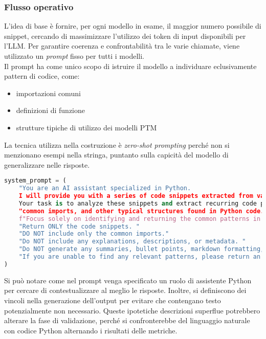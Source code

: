\documentclass{article}
\begin{document}
\subsubsection{Flusso operativo}
L'idea di base è fornire, per ogni modello in esame, il maggior numero possibile di snippet, cercando di massimizzare l’utilizzo dei token di input disponibili per l’LLM. Per garantire coerenza e confrontabilità tra le varie chiamate, viene utilizzato un \textit{prompt} fisso per tutti i modelli. \\
Il prompt ha come unico scopo di istruire il modello a individuare eclusivamente pattern di codice, come:
\begin{itemize}
    \item importazioni comuni
    \item definizioni di funzione
    \item strutture tipiche di utilizzo dei modelli PTM
\end{itemize}
La tecnica utilizza nella costruzione è \textit{zero-shot prompting} perché non si menzionano esempi nella stringa, puntanto sulla capicità del modello di generalizzare nelle risposte.
\begin{lstlisting}[language=Python, caption={System prompt per l'LLM}, label={lst:system-prompt}]
system_prompt = (
    "You are an AI assistant specialized in Python. 
    I will provide you with a series of code snippets extracted from various Python files. Note that these snippets might not form a coherent or complete code module when combined together.
    Your task is to analyze these snippets and extract recurring code patterns, such as function definitions (using 'def'), "
    "common imports, and other typical structures found in Python code. "
    f"Focus solely on identifying and returning the common patterns in the context of the model '{snippet_model}'.\n"
    "Return ONLY the code snippets. "
    "DO NOT include only the common imports."
    "Do NOT include any explanations, descriptions, or metadata. "
    "Do NOT generate any summaries, bullet points, markdown formatting, or additional text. "
    "If you are unable to find any relevant patterns, please return an empty string."
)
\end{lstlisting}
Si può notare come nel prompt venga specificato un ruolo di assistente Python per cercare di contestualizzare al meglio le risposte. Inoltre, si definiscono dei vincoli nella generazione dell'output per evitare che contengano testo potenzialmente non necessario. Queste ipotetiche descrizioni superflue potrebbero alterare la fase di validazione, perché si confronterebbe del linguaggio naturale con codice Python alternando i risultati delle metriche.
\end{document}

